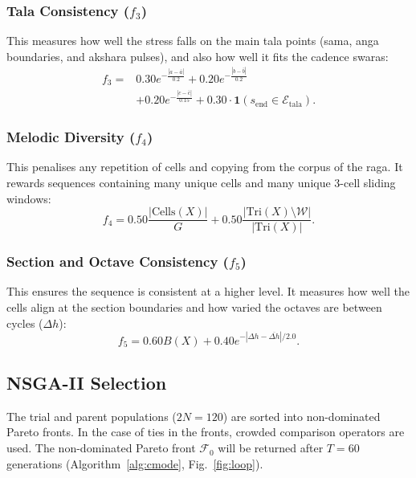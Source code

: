 \documentclass[conference,letterpaper]{IEEEtran}
\newcommand{\ind}{\mathbf{1}}
\begin{document}
\subsubsection{Tala Consistency ($f_3$)}
This measures how well the stress falls on the main tala points (sama, anga boundaries, and akshara pulses), and also how well it fits the cadence swaras:
\begin{equation}
\begin{split}
 f_3 ={}& 0.30 e^{-\frac{|a - \bar{a}|}{0.2}} + 0.20 e^{-\frac{|b - \bar{b}|}{0.2}} \\
       & + 0.20 e^{-\frac{|c - \bar{c}|}{0.15}} + 0.30 \cdot \ind(s_{\text{end}} \in \mathcal{E}_{\text{tala}}).
\end{split}
\end{equation}

\subsubsection{Melodic Diversity ($f_4$)}
This penalises any repetition of cells and copying from the corpus of the raga. It rewards sequences containing many unique cells and many unique 3-cell sliding windows:
\begin{equation}
 f_4 = 0.50 \frac{|\text{Cells}(X)|}{G} + 0.50 \frac{|\text{Tri}(X) \setminus \mathcal{W}|}{|\text{Tri}(X)|}.
\end{equation}

\subsubsection{Section and Octave Consistency ($f_5$)}
This ensures the sequence is consistent at a higher level. It measures how well the cells align at the section boundaries and how varied the octaves are between cycles ($\Delta h$):
\begin{equation}
 f_5 = 0.60 B(X) + 0.40 e^{-{|\Delta h - \overline{\Delta h}|}/{2.0}}.
\end{equation}

\subsection{NSGA-II Selection}
The trial and parent populations ($2N = 120$) are sorted into non-dominated Pareto fronts. In the case of ties in the fronts, crowded comparison operators are used. The non-dominated Pareto front $\mathcal{F}_0$ will be returned after $T=60$ generations (Algorithm~\ref{alg:cmode}, Fig.~\ref{fig:loop}).
\end{document}
